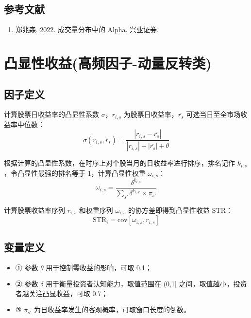 \documentclass{article}
\begin{document}
\subsection{参考文献}
\begin{enumerate}
    \item 郑兆森. 2022. 成交量分布中的 Alpha. 兴业证券.
\end{enumerate}

\section{凸显性收益(高频因子-动量反转类)}

\subsection{因子定义}
计算股票日收益率的凸显性系数 \( \sigma \)，\( r_{i,s} \) 为股票日收益率，\( \overline{r_s} \) 可选当日至全市场收益率中位数：
\begin{equation}
    \sigma(r_{i,s}, \overline{r_s}) = \frac{|r_{i,s} - \overline{r_s}|}{|r_{i,s}| + |\overline{r_s}| + \theta}
\end{equation}

根据计算的凸显性系数，在时序上对个股当月的日收益率进行排序，排名记作 \( k_{i,s} \)，令凸显性最强的排名等于 1，计算凸显性权重 \( \omega_{i,s} \)：
\begin{equation}
    \omega_{i,s} = \frac{\delta^{k_{i,s}}}{\sum_{s'} \delta^{k_{i,s'}} \times \pi_{s'}}
\end{equation}

计算股票收益率序列 \( r_{i,s} \) 和权重序列 \( \omega_{i,s} \) 的协方差即得到凸显性收益 \( \mathrm{STR} \)：
\begin{equation}
    \mathrm{STR}_i = \mathrm{cov}[\omega_{i,s}, r_{i,s}]
\end{equation}

\subsection{变量定义}
\begin{itemize}
    \item ① 参数 \( \theta \) 用于控制零收益的影响，可取 0.1；
    \item ② 参数 \( \delta \) 用于衡量投资者认知能力，取值范围在 (0,1] 之间，取值越小，投资者越关注凸显收益，可取 0.7；
    \item ③ \( \pi_{s'} \) 为日收益率发生的客观概率，可取窗口长度的倒数。
\end{itemize}
\end{document}
